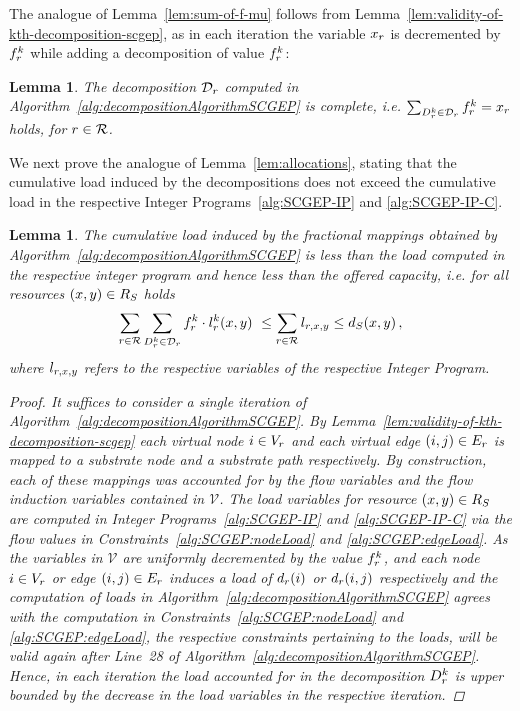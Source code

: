 \documentclass[10pt, conference, letterpaper]{IEEEtran}
\newtheorem{lemma}[theorem]{Lemma}
\begin{document}
The analogue of Lemma~\ref{lem:sum-of-f-mu} follows from Lemma~\ref{lem:validity-of-kth-decomposition-scgep}, as in each iteration the variable $x_{r}$ is decremented by $\prob$ while adding a decomposition of value $\prob$:

\begin{lemma}
\label{lem:sum-of-f-mu-scgep}
The decomposition $\PotEmbeddings$ computed in Algorithm~\ref{alg:decompositionAlgorithmSCGEP} is complete, i.e. $\sum_{\decomp \in \PotEmbeddings} \prob = x_\req$ holds, for $r \in \mathcal{R}$.
\end{lemma}

We next prove the analogue of Lemma~\ref{lem:allocations}, stating that the cumulative load induced by the decompositions does not exceed the cumulative load in the respective Integer Programs~\ref{alg:SCGEP-IP} and \ref{alg:SCGEP-IP-C}.

\begin{lemma}
\label{lem:allocations-scgep}
The cumulative load induced by the fractional mappings obtained by Algorithm~\ref{alg:decompositionAlgorithmSCGEP} is less than the load computed in the respective integer program and hence less than the offered capacity, i.e. for all resources $(x,y) \in  R_{S}$ holds
\begin{align}
\sum_{\req \in \requests} \sum_{\decomp \in \PotEmbeddings} \prob \cdot \load(x,y)~\leq \sum_{\req \in \requests} l_{\req, x,y} \leq  \Scap(x,y)\,,
\label{eq:lem:allocations-scgep}
\end{align}
where $l_{r,x,y}$ refers to the respective variables of the respective Integer Program.
\begin{proof}
It suffices to consider a single iteration of Algorithm~\ref{alg:decompositionAlgorithmSCGEP}. By Lemma~\ref{lem:validity-of-kth-decomposition-scgep} each virtual node $i \in V_{r}$ and each virtual edge $(i,j) \in  E_{r}$ is mapped to a substrate node and a substrate path respectively. By construction, each of these mappings was accounted for by the flow variables and the flow induction variables contained in $\mathcal{V}$. The load variables for resource $(x,y) \in  R_{S}$ are computed in Integer Programs~\ref{alg:SCGEP-IP} and \ref{alg:SCGEP-IP-C} via the flow values in Constraints~\ref{alg:SCGEP:nodeLoad} and \ref{alg:SCGEP:edgeLoad}. As the variables in $\mathcal{V}$ are uniformly decremented by the value $\prob$, and each node $i \in V_{r}$ or edge $(i,j) \in  E_{r}$ induces a load of $d_{r}(i)$ or $d_{r}(i,j)$ respectively and the computation of loads in Algorithm~\ref{alg:decompositionAlgorithmSCGEP} agrees with the computation in Constraints~\ref{alg:SCGEP:nodeLoad} and \ref{alg:SCGEP:edgeLoad}, the respective constraints pertaining to the loads, will be valid again after Line~28 of Algorithm~\ref{alg:decompositionAlgorithmSCGEP}. Hence, in each iteration the load accounted for in the decomposition $\decomp$ is upper bounded by the \emph{decrease} in the load variables in the respective iteration.
\end{proof}
\end{lemma}
\end{document}
